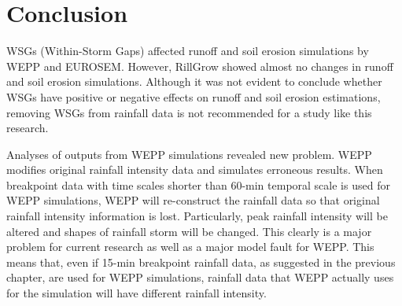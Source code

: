 \section{Conclusion}
\label{sec:InterStormPeriodsWithinAStormConclusion}

WSGs (Within-Storm Gaps) affected runoff and soil erosion simulations by WEPP
and EUROSEM. However, RillGrow showed almost no changes in runoff and soil
erosion simulations. Although it was not evident to conclude whether WSGs have
positive or negative effects on runoff and soil erosion estimations, removing
WSGs from rainfall data is not recommended for a study like this research.


Analyses of outputs from WEPP simulations revealed new problem. WEPP modifies
original rainfall intensity data and simulates erroneous results. When
breakpoint data with time scales shorter than 60-min temporal scale is used
for WEPP simulations, WEPP will re-construct the rainfall data so that original
rainfall intensity information is lost. Particularly, peak rainfall intensity
will be altered and shapes of rainfall storm will be changed. This clearly is a
major problem for current research as well as a major model fault for WEPP.
This means that, even if 15-min breakpoint rainfall data, as suggested
in the previous chapter, are used for WEPP simulations, rainfall data that WEPP
actually uses for the simulation will have different rainfall intensity.


%


